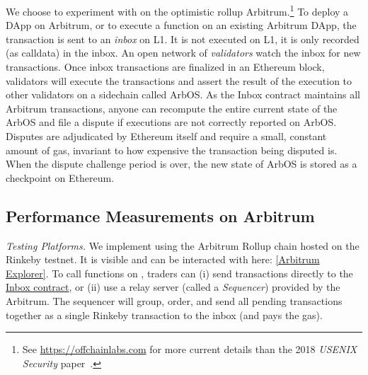 We choose to experiment with \cm on the optimistic rollup Arbitrum.\footnote{See \url{https://offchainlabs.com} for more current details than the 2018 \textit{USENIX Security} paper~\cite{kalodner2018arbitrum}.} To deploy a DApp on Arbitrum, or to execute a function on an existing Arbitrum DApp, the transaction is sent to an \textit{inbox} on L1. It is not executed on L1, it is only recorded (as calldata) in the inbox. An open network of \textit{validators} watch the inbox for new transactions. Once inbox transactions are finalized in an Ethereum block, validators will execute the transactions and assert the result of the execution to other validators on a sidechain called \textsf{ArbOS}. As the Inbox contract maintains all Arbitrum transactions, anyone can recompute the entire current state of the ArbOS and file a dispute if executions are not correctly reported on ArbOS. Disputes are adjudicated by Ethereum itself and require a small, constant amount of gas, invariant to how expensive the transaction being disputed is. When the dispute challenge period is over, the new state of ArbOS is stored as a checkpoint on Ethereum. 



\subsection{\cm Performance Measurements on Arbitrum}


\textit{Testing Platforms.} We implement \cm using the Arbitrum Rollup chain hosted on the Rinkeby testnet.  It is visible and can be interacted with here: \href{https://rinkeby-explorer.arbitrum.io/address/0x0aa5449a9f7fa34a81ce1dc720563938a27e8b03}{[Arbitrum Explorer]}. To call functions on \cm, traders can (i) send transactions directly to the \href{https://rinkeby.etherscan.io/address/0x578BAde599406A8fE3d24Fd7f7211c0911F5B29e}{Inbox contract}, or (ii) use a relay server (called a \textit{Sequencer}) provided by the Arbitrum. The sequencer will group, order, and send all pending transactions together as a single Rinkeby transaction to the inbox (and pays the gas).

